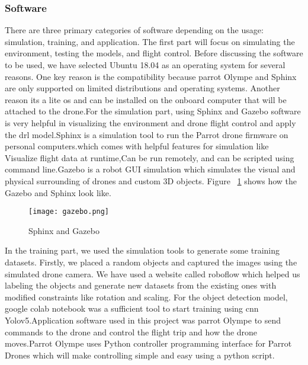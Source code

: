 \documentclass[../main.tex]{subfiles}
\begin{document}
\subsubsection{Software}
There are three primary categories of software depending on the usage: simulation, training, and application. The first part will focus on simulating the environment, testing the models, and flight control. Before discussing the software to be used, we have selected Ubuntu 18.04 as an operating system for several reasons. One key reason is the compatibility because parrot Olympe and Sphinx are only supported on limited distributions and operating systems. Another reason its a lite os and can be installed on the onboard computer that will be attached to the drone.For the simulation part, using Sphinx and Gazebo software is very helpful in visualizing the environment and drone flight control and apply the \gls{drl} model.Sphinx is a simulation tool to run the Parrot drone firmware on personal computers.which comes with helpful features for simulation like Visualize flight data at runtime,Can be run remotely, and can be scripted using command line.Gazebo is a robot GUI simulation which simulates the visual and physical surrounding of drones and custom 3D objects. Figure ~\ref{fig2:gazebo} shows how the Gazebo and Sphinx look like. \begin{figure}[H]
	\centering
	\texttt{[image: gazebo.png]}
	\caption{Sphinx and Gazebo }\label{fig2:gazebo}
\end{figure}
In the training part, we used the simulation tools to generate some training datasets. Firstly, we placed a random objects and captured the images using the simulated drone camera. We have used a website called roboflow which helped us labeling the objects and generate new datasets from the existing ones with modified constraints like rotation and scaling. For the object detection model, google colab notebook was a sufficient tool to start training using \gls{cnn} Yolov5.Application software used in this project was parrot Olympe to send commands to the drone and control the flight trip and how the drone moves.Parrot Olympe uses Python controller programming interface for Parrot Drones which will make controlling simple and easy using a python script.
\end{document}
